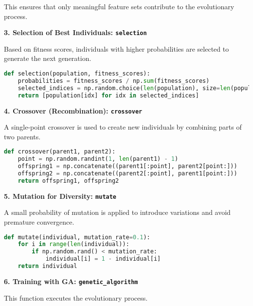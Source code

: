 This ensures that only meaningful feature sets contribute to the evolutionary process.

${}$\\
\textbf{3. Selection of Best Individuals: \texttt{selection}}

Based on fitness scores, individuals with higher probabilities are selected to generate the next generation.

\begin{lstlisting}[language=Python]
def selection(population, fitness_scores):
    probabilities = fitness_scores / np.sum(fitness_scores)
    selected_indices = np.random.choice(len(population), size=len(population), p=probabilities)
    return [population[idx] for idx in selected_indices]
\end{lstlisting}

${}$\\
\textbf{4. Crossover (Recombination): \texttt{crossover}}

A single-point crossover is used to create new individuals by combining parts of two parents.

\begin{lstlisting}[language=Python]
def crossover(parent1, parent2):
    point = np.random.randint(1, len(parent1) - 1)
    offspring1 = np.concatenate((parent1[:point], parent2[point:]))
    offspring2 = np.concatenate((parent2[:point], parent1[point:]))
    return offspring1, offspring2
\end{lstlisting}

${}$\\
\textbf{5. Mutation for Diversity: \texttt{mutate}}

A small probability of mutation is applied to introduce variations and avoid premature convergence.

\begin{lstlisting}[language=Python]
def mutate(individual, mutation_rate=0.1):
    for i in range(len(individual)):
        if np.random.rand() < mutation_rate:
            individual[i] = 1 - individual[i]
    return individual
\end{lstlisting}

${}$\\
\textbf{6. Training with GA: \texttt{genetic\_algorithm}}

This function executes the evolutionary process.

